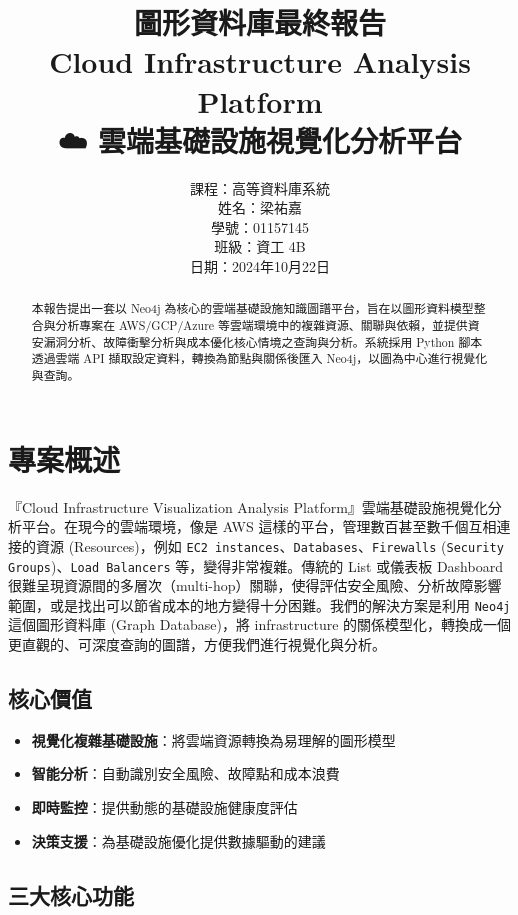\documentclass[11pt,a4paper]{ctexart}
\title{圖形資料庫最終報告\\Cloud Infrastructure Analysis Platform\\☁️ 雲端基礎設施視覺化分析平台}
\author{課程：高等資料庫系統\\姓名：梁祐嘉\\學號：01157145\\班級：資工 4B\\日期：2024年10月22日}
\date{}
\begin{document}
\maketitle

\renewcommand{\abstractname}{\large 摘要}
\begin{abstract}
\normalsize
本報告提出一套以 Neo4j 為核心的雲端基礎設施知識圖譜平台，旨在以圖形資料模型整合與分析專案在 AWS/GCP/Azure 等雲端環境中的複雜資源、關聯與依賴，並提供資安漏洞分析、故障衝擊分析與成本優化核心情境之查詢與分析。系統採用 Python 腳本透過雲端 API 擷取設定資料，轉換為節點與關係後匯入 Neo4j，以圖為中心進行視覺化與查詢。
\end{abstract}

\tableofcontents
\clearpage

\section{專案概述}

『Cloud Infrastructure Visualization Analysis Platform』雲端基礎設施視覺化分析平台。在現今的雲端環境，像是 AWS 這樣的平台，管理數百甚至數千個互相連接的資源 (Resources)，例如 \texttt{EC2 instances}、\texttt{Databases}、\texttt{Firewalls} (\texttt{Security Groups})、\texttt{Load Balancers} 等，變得非常複雜。傳統的 List 或儀表板 Dashboard 很難呈現資源間的多層次（multi-hop）關聯，使得評估安全風險、分析故障影響範圍，或是找出可以節省成本的地方變得十分困難。我們的解決方案是利用 \texttt{Neo4j} 這個圖形資料庫 (Graph Database)，將 infrastructure 的關係模型化，轉換成一個更直觀的、可深度查詢的圖譜，方便我們進行視覺化與分析。

\subsection{核心價值}
\begin{itemize}[leftmargin=1.5em]
\item \textbf{視覺化複雜基礎設施}：將雲端資源轉換為易理解的圖形模型
\item \textbf{智能分析}：自動識別安全風險、故障點和成本浪費
\item \textbf{即時監控}：提供動態的基礎設施健康度評估
\item \textbf{決策支援}：為基礎設施優化提供數據驅動的建議
\end{itemize}

\subsection{三大核心功能}
\end{document}
